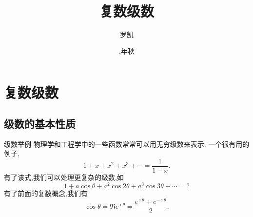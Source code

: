 \documentclass[fontset=windows, chinese, 10pt]{beamer}
\title{复数级数}
\date{\zhdigits{\the\year},\zhganzhinian{\the\year}年秋}
\author{罗凯}
\institute{南京理工大学物理学院}
\begin{document}

  

  
  
  
  \begin{frame}
  \titlepage
  \end{frame}
  
  

\section{复数级数}

\subsection{级数的基本性质}
\label{sec:preknowledge}

\begin{frame}{级数举例}
  \small
物理学和工程学中的一些函数常常可以用无穷级数来表示.
一个很有用的例子,
\begin{equation}
    1+ x + x^2 + x^3 + \cdots = \frac{1}{1-x} .
\end{equation}
有了该式,我们可以处理更复杂的级数,如
\begin{equation}
    1 + a \cos \theta + a^2 \cos 2\theta + a^3 \cos 3\theta + \cdots = ? 
\end{equation}
有了前面的复数概念,我们有
\begin{equation}
    \cos \theta = \Re e^{\imath \theta} = \frac{e^{\imath \theta} +e^{-\imath \theta} }{2} .
\end{equation}

\end{frame}
\end{document}
